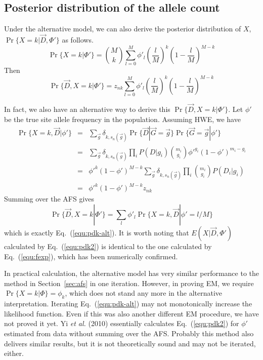 \documentclass[pdftex,10pt]{book}
\begin{document}
\subsection{Posterior distribution of the allele count}
Under the alternative model, we can also derive the posterior
distribution of $X$, $\Pr\{X=k|\vec{D},\Phi'\}$ as follows.
$$
\Pr\{X=k|\Phi'\}=\binom{M}{k}\sum_{l=0}^M\phi'_l\left(\frac{l}{M}\right)^k\left(1-\frac{l}{M}\right)^{M-k}
$$
Then
\begin{equation}\label{equ:pdk-alt}
\Pr\{\vec{D},X=k|\Phi'\}=z_{nk}\sum_{l=0}^M\phi'_l\left(\frac{l}{M}\right)^k\left(1-\frac{l}{M}\right)^{M-k}
\end{equation}

In fact, we also have an alternative way to derive this
$\Pr\{\vec{D},X=k|\Phi'\}$. Let $\phi'$ be the true site allele
frequency in the population. Assuming HWE, we have
\begin{eqnarray}\label{equ:pdk2}
\Pr\{X=k,\vec{D}|\phi'\}&=&\sum_{\vec{g}}\delta_{k,s_n(\vec{g})}\Pr\{\vec{D}|\vec{G}=\vec{g}\}\Pr\{\vec{G}=\vec{g}|\phi'\}\\\nonumber
&=&\sum_{\vec{g}}\delta_{k,s_n(\vec{g})}\prod_iP(D|g_i)\binom{m_i}{g_i}\phi'^{g_i}(1-\phi')^{m_i-g_i}\\\nonumber
&=&\phi'^k(1-\phi')^{M-k}\sum_{\vec{g}}\delta_{k,s_n(\vec{g})}\prod_i\binom{m_i}{g_i}P(D_i|g_i)\\\nonumber
&=&\phi'^k(1-\phi')^{M-k}z_{nk}
\end{eqnarray}
Summing over the AFS gives
\begin{equation*}
\Pr\{\vec{D},X=k|\Phi'\}=\sum_l\phi'_l\Pr\{X=k,\vec{D}|\phi'=l/M\}
\end{equation*}
which is exactly Eq.~(\ref{equ:pdk-alt}). It is worth noting that
$E(X|\vec{D},\Phi')$ calculated by Eq.~(\ref{equ:pdk2}) is identical to
the one calculated by Eq.~(\ref{equ:fexp}), which has been numerically
confirmed.

In practical calculation, the alternative model has very similar
performance to the method in Section~\ref{sec:afs} in one
iteration. However, in proving EM, we require $\Pr\{X=k|\Phi\}=\phi_k$,
which does not stand any more in the alternative
interpretation. Iterating Eq.~(\ref{equ:pdk-alt}) may not monotonically
increase the likelihood function. Even if this was also another
different EM procedure, we have not proved it yet. Yi {\it et al.}
(2010) essentially calculates Eq.~(\ref{equ:pdk2}) for $\phi'$ estimated
from data without summing over the AFS. Probably this method also
delivers similar results, but it is not theoretically sound and may not
be iterated, either.
\end{document}
